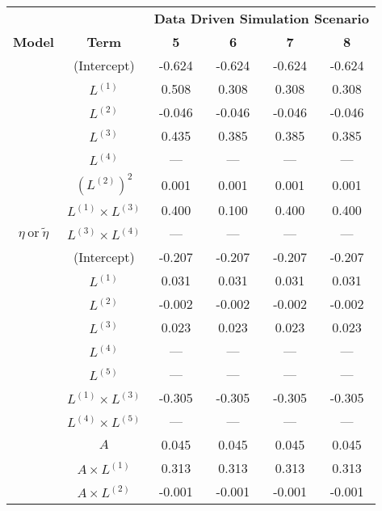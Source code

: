 \begin{sidewaystable}
    \footnotesize
\begin{minipage}[t]{0.5\textwidth}
\centering

\begin{tabular}[t]{>{}ccccc>{}c}
\hline
\multicolumn{1}{c}{\textbf{ }} & \multicolumn{1}{c}{\textbf{ }} & \multicolumn{4}{c}{\textbf{Data Driven Simulation Scenario}} \\
\cmidrule{3-6}
\textbf{Model} & \textbf{Term} & \textbf{5} & \textbf{6} & \textbf{7} & \textbf{8}\\
\hline
 & (Intercept) & -0.624 & -0.624 & -0.624 & -0.624\\
\cmidrule{2-6}
 & $L^{(1)}$ & 0.508 & 0.308 & 0.308 & 0.308\\
\cmidrule{2-6}
 & $L^{(2)}$ & -0.046 & -0.046 & -0.046 & -0.046\\
\cmidrule{2-6}
 & $L^{(3)}$ & 0.435 & 0.385 & 0.385 & 0.385\\
\cmidrule{2-6}
 & $L^{(4)}$ & --- & --- & --- & ---\\
\cmidrule{2-6}
 & $(L^{(2)})^2$ & 0.001 & 0.001 & 0.001 & 0.001\\
\cmidrule{2-6}
 & $L^{(1)} \times L^{(3)}$ & 0.400 & 0.100 & 0.400 & 0.400\\
\cmidrule{2-6}
\multirow{-8}{*}{\centering\arraybackslash $\eta~\text{or}~\tilde\eta$} & $L^{(3)} \times L^{(4)}$ & --- & --- & --- & ---\\
\cmidrule{1-6}
 & (Intercept) & -0.207 & -0.207 & -0.207 & -0.207\\
\cmidrule{2-6}
 & $L^{(1)}$ & 0.031 & 0.031 & 0.031 & 0.031\\
\cmidrule{2-6}
 & $L^{(2)}$ & -0.002 & -0.002 & -0.002 & -0.002\\
\cmidrule{2-6}
 & $L^{(3)}$ & 0.023 & 0.023 & 0.023 & 0.023\\
\cmidrule{2-6}
 & $L^{(4)}$ & --- & --- & --- & ---\\
\cmidrule{2-6}
 & $L^{(5)}$ & --- & --- & --- & ---\\
\cmidrule{2-6}
 & $L^{(1)} \times L^{(3)}$ & -0.305 & -0.305 & -0.305 & -0.305\\
\cmidrule{2-6}
 & $L^{(4)} \times L^{(5)}$ & --- & --- & --- & ---\\
\cmidrule{2-6}
 & $A$ & 0.045 & 0.045 & 0.045 & 0.045\\
\cmidrule{2-6}
 & $A \times L^{(1)}$ & 0.313 & 0.313 & 0.313 & 0.313\\
\cmidrule{2-6}
 & $A \times L^{(2)}$ & -0.001 & -0.001 & -0.001 & -0.001\\

\end{tabular}
\end{minipage}
\end{sidewaystable}
